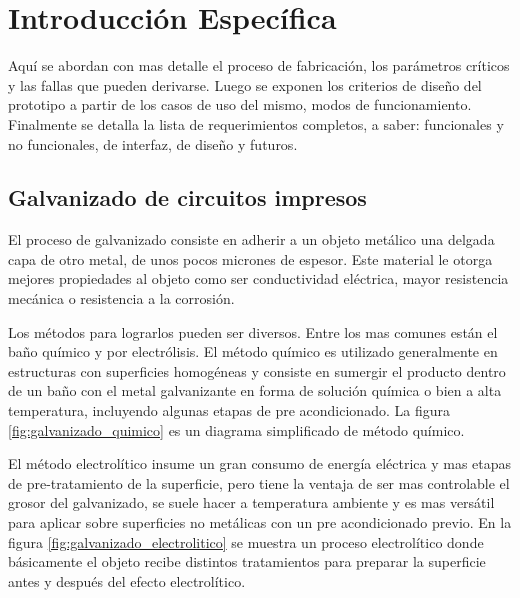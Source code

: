 \chapter{ Introducción Específica } %
Aquí se abordan con mas detalle el proceso de fabricación, los parámetros críticos y las fallas que pueden derivarse. Luego se exponen los criterios de diseño del prototipo a partir de los casos de uso del mismo, modos de funcionamiento. Finalmente se detalla la lista de requerimientos completos, a saber: funcionales y no funcionales, de interfaz, de diseño y futuros.

\section{ Galvanizado de circuitos impresos }

El proceso de galvanizado consiste en adherir a un objeto metálico una delgada capa de otro metal, de unos pocos micrones de espesor. Este material le otorga mejores propiedades al objeto como ser conductividad eléctrica, mayor resistencia mecánica o resistencia a la corrosión. 

Los métodos para lograrlos pueden ser diversos. Entre los mas comunes están el baño químico y por electrólisis. El método químico es utilizado generalmente en estructuras con superficies homogéneas y consiste en sumergir el producto dentro de un baño con el metal galvanizante en forma de solución química o bien a alta temperatura, incluyendo algunas etapas de pre acondicionado. La figura \ref{fig:galvanizado_quimico} es un diagrama simplificado de método químico.

El método electrolítico insume un gran consumo de energía eléctrica y mas etapas de pre-tratamiento de la superficie, pero tiene la ventaja de ser mas controlable el grosor del galvanizado, se suele hacer a temperatura ambiente y es mas versátil para aplicar sobre superficies no metálicas con un pre acondicionado previo. En la figura \ref{fig:galvanizado_electrolitico} se muestra un proceso electrolítico donde básicamente el objeto recibe distintos tratamientos para preparar la superficie antes y después del efecto electrolítico. 

